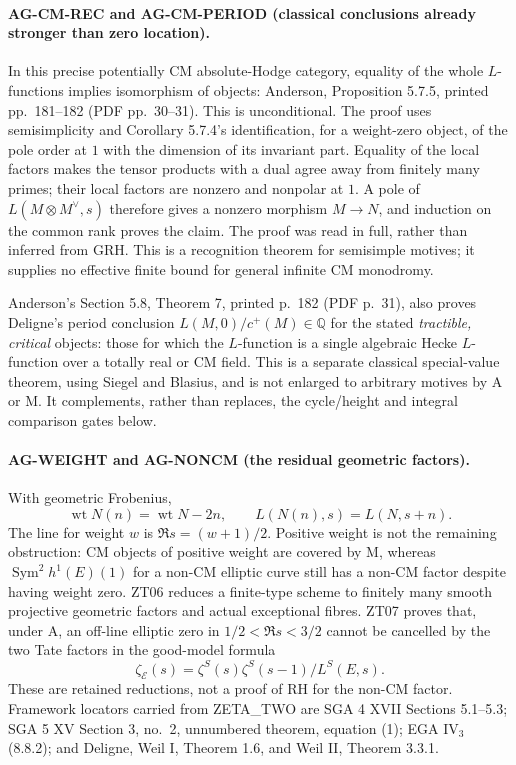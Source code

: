 \documentclass[11pt,a4paper]{article}
\begin{document}
\paragraph{AG-CM-REC and AG-CM-PERIOD (classical conclusions already
stronger than zero location).}
In this precise potentially CM absolute-Hodge category, equality of the
whole $L$-functions implies isomorphism of objects: Anderson,
Proposition 5.7.5, printed pp.~181--182 (PDF pp.~30--31). This is
unconditional. The proof uses semisimplicity and Corollary 5.7.4's
identification, for a weight-zero object, of the pole order at $1$ with
the dimension of its invariant part. Equality of the local factors makes
the tensor products with a dual agree away from finitely many primes;
their local factors are nonzero and nonpolar at $1$. A pole of
$L(M\otimes M^\vee,s)$ therefore gives a nonzero morphism
$M\longrightarrow N$, and induction on the common rank proves the
claim. The proof was read in full, rather than inferred from GRH.
This is a recognition theorem for semisimple motives; it supplies no
effective finite bound for general infinite CM monodromy.

Anderson's Section 5.8, Theorem 7, printed p.~182 (PDF p.~31), also
proves Deligne's period conclusion
$L(M,0)/c^+(M)\in\mathbb Q$ for the stated \emph{tractible, critical}
objects: those for which the $L$-function is a single algebraic Hecke
$L$-function over a totally real or CM field. This is a separate
classical special-value theorem, using Siegel and Blasius, and is not
enlarged to arbitrary motives by A or M. It complements, rather than
replaces, the cycle/height and integral comparison gates below.

\paragraph{AG-WEIGHT and AG-NONCM (the residual geometric factors).}
With geometric Frobenius,
\[
 \operatorname{wt}N(n)=\operatorname{wt}N-2n,
 \qquad L(N(n),s)=L(N,s+n).
\]
The line for weight $w$ is $\Re s=(w+1)/2$. Positive weight is not the
remaining obstruction: CM objects of positive weight are covered by M,
whereas $\operatorname{Sym}^2h^1(E)(1)$ for a non-CM elliptic curve still
has a non-CM factor despite having weight zero. ZT06 reduces a finite-type
scheme to finitely many smooth projective geometric factors and actual
exceptional fibres. ZT07 proves that, under A, an off-line elliptic zero
in $1/2<\Re s<3/2$ cannot be cancelled by the two Tate factors in the
good-model formula
\[
 \zeta_{\mathcal E}(s)
   =\zeta^S(s)\zeta^S(s-1)/L^S(E,s).
\]
These are retained reductions, not a proof of RH for the non-CM factor.
Framework locators carried from ZETA\_TWO are SGA 4 XVII Sections 5.1--5.3;
SGA 5 XV Section 3, no.~2, unnumbered theorem, equation (1);
EGA IV$_3$ (8.8.2); and Deligne, Weil I, Theorem 1.6, and Weil II,
Theorem 3.3.1.
\end{document}
